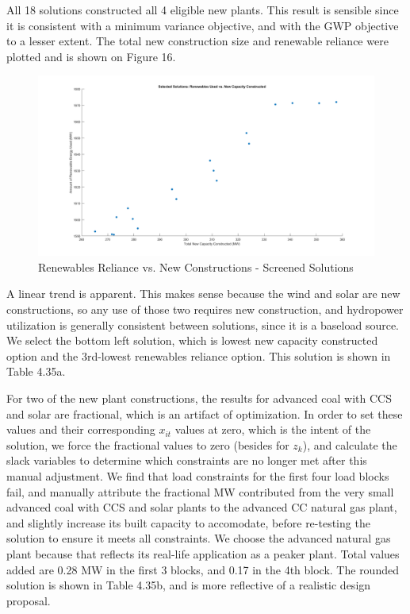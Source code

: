 \documentclass{article}
\begin{document}
		All 18 solutions constructed all 4 eligible new plants. This result is sensible since it is consistent with a minimum variance objective, and with the GWP objective to a lesser extent. The total new construction size and renewable reliance were plotted and is shown on Figure 16.
		
		\begin{figure}
			\includegraphics[width=\textwidth]{435_16_renMW_vs_newMW}
			\caption{Renewables Reliance vs. New Constructions - Screened Solutions}
		\end{figure} 
		
		A linear trend is apparent. This makes sense because the wind and solar are new constructions, so any use of those two requires new construction, and hydropower utilization is generally consistent between solutions, since it is a baseload source. We select the bottom left solution, which is lowest new capacity constructed option and the 3rd-lowest renewables reliance option. This solution is shown in Table 4.35a.
		
		For two of the new plant constructions, the results for advanced coal with CCS and solar are fractional, which is an artifact of optimization. In order to set these values and their corresponding $x_{it}$ values at zero, which is the intent of the solution, we force the fractional values to zero (besides for $z_k$), and calculate the slack variables to determine which constraints are no longer met after this manual adjustment. We find that load constraints for the first four load blocks fail, and manually attribute the fractional MW contributed from the very small advanced coal with CCS and solar plants to the advanced CC natural gas plant, and slightly increase its built capacity to accomodate, before re-testing the solution to ensure it meets all constraints. We choose the advanced natural gas plant because that reflects its real-life application as a peaker plant. Total values added are 0.28 MW in the first 3 blocks, and 0.17 in the 4th block. The rounded solution is shown in Table 4.35b, and is more reflective of a realistic design proposal.
		
\end{document}
